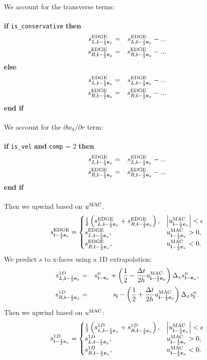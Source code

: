 We account for the transverse terms:\\ \\
{\bf if} {\tt is\_conservative} {\bf then}
\begin{eqnarray}
s_{L,{\bf i}-\frac{1}{2}{\bf e}_x}^{\rm EDGE} &=& s_{L,{\bf i}-\frac{1}{2}{\bf e}_x}^{\rm EDGE} - ...\\
s_{R,{\bf i}-\frac{1}{2}{\bf e}_x}^{\rm EDGE} &=& s_{R,{\bf i}-\frac{1}{2}{\bf e}_x}^{\rm EDGE} - ...
\end{eqnarray}
{\bf else}
\begin{eqnarray}
s_{L,{\bf i}-\frac{1}{2}{\bf e}_x}^{\rm EDGE} &=& s_{L,{\bf i}-\frac{1}{2}{\bf e}_x}^{\rm EDGE} - ...\\
s_{R,{\bf i}-\frac{1}{2}{\bf e}_x}^{\rm EDGE} &=& s_{R,{\bf i}-\frac{1}{2}{\bf e}_x}^{\rm EDGE} - ...
\end{eqnarray}
{\bf end if}\\ \\
We account for the $\partial w_0/\partial r$ term:\\ \\
{\bf if} {\tt is\_vel} {\bf and} {\tt comp} = 2 {\bf then}
\begin{eqnarray}
s_{L,{\bf i}-\frac{1}{2}{\bf e}_x}^{\rm EDGE} &=& s_{L,{\bf i}-\frac{1}{2}{\bf e}_x}^{\rm EDGE} - ...\\
s_{R,{\bf i}-\frac{1}{2}{\bf e}_x}^{\rm EDGE} &=& s_{R,{\bf i}-\frac{1}{2}{\bf e}_x}^{\rm EDGE} - ...
\end{eqnarray}
{\bf end if}\\ \\
Then we upwind based on $u^{\rm MAC}$.
\begin{equation}
s_{{\bf i}-\frac{1}{2}{\bf e}_x}^{\rm EDGE} =
\begin{cases}
\frac{1}{2}\left(s_{L,{\bf i}-\frac{1}{2}{\bf e}_x}^{\rm EDGE} + s_{R,{\bf i}-\frac{1}{2}{\bf e}_x}^{\rm EDGE}\right), & \left|u^{\rm MAC}_{{\bf i}-\frac{1}{2}{\bf e}_x}\right| < \epsilon \\
s_{L,{\bf i}-\frac{1}{2}{\bf e}_x}^{\rm EDGE}, & u^{\rm MAC}_{{\bf i}-\frac{1}{2}{\bf e}_x} > 0, \\
s_{R,{\bf i}-\frac{1}{2}{\bf e}_x}^{\rm EDGE}, & u^{\rm MAC}_{{\bf i}-\frac{1}{2}{\bf e}_x} < 0.
\end{cases}
\end{equation}
We predict $s$ to x-faces using a 1D extrapolation:
\begin{eqnarray}
s_{L,{\bf i}-\frac{1}{2}{\bf e}_x}^{1D} &=& s_{{\bf i}-{\bf e}_x}^n + \left(\frac{1}{2} - \frac{\Delta t}{2h}u_{{\bf i}-\frac{1}{2}{\bf e}_x}^{\rm MAC}\right)\Delta_x s_{{\bf i}-{\bf e}_x}^n, \\
s_{R,{\bf i}-\frac{1}{2}{\bf e}_x}^{1D} &=& s_{{\bf i}} - \left(\frac{1}{2} + \frac{\Delta t}{2h}u_{{\bf i}-\frac{1}{2}{\bf e}_x}^{\rm MAC}\right)\Delta_x s_{{\bf i}}^n.
\end{eqnarray}
Then we upwind based on $u^{\rm MAC}$:
\begin{equation}
s_{{\bf i}-\frac{1}{2}{\bf e}_x}^{1D} =
\begin{cases}
\frac{1}{2}\left(s_{L,{\bf i}-\frac{1}{2}{\bf e}_x}^{1D} + s_{R,{\bf i}-\frac{1}{2}{\bf e}_x}^{1D}\right), & \left|u^{\rm MAC}_{{\bf i}-\frac{1}{2}{\bf e}_x}\right| < \epsilon \\
s_{L,{\bf i}-\frac{1}{2}{\bf e}_x}^{1D}, & u^{\rm MAC}_{{\bf i}-\frac{1}{2}{\bf e}_x} > 0, \\
s_{R,{\bf i}-\frac{1}{2}{\bf e}_x}^{1D}, & u^{\rm MAC}_{{\bf i}-\frac{1}{2}{\bf e}_x} < 0. \\
\end{cases}
\end{equation}
